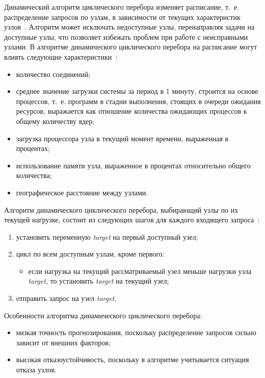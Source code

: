 Динамический алгоритм циклического перебора изменяет расписание, т.~е. распределение запросов по узлам, в зависимости от текущих характеристик узлов~\cite{drr}.
Алгоритм может исключать недоступные узлы, перенаправляя задачи на доступные узлы, что позволяет избежать проблем при работе с неисправными узлами. 
В алгоритме динамического циклического перебора на расписание могут влиять следующие характеристики~\cite{dll_warsh, com_analysis, part_algos}: 
\begin{itemize}
	\item количество соединений;
	\item среднее значение загрузки системы за период в 1 минуту, строится на основе процессов, т.~е. программ в стадии выполнения, стоящих в очереди ожидания ресурсов, выражается как отношение количества ожидающих процессов к общему количеству ядер;
	\item загрузка процессора узла в текущий момент времени, выраженная в процентах;
	\item использование памяти узла, выраженное в процентах относительно общего количества;
	\item географическое расстояние между узлами.
\end{itemize}
Алгоритм динамического циклического перебора, выбирающий узлы по их текущей нагрузке, состоит из следующих шагов для каждого входящего запроса~\cite{com_analysis}:
\begin{enumerate}
	\item установить переменную \textit{target} на первый доступный узел;
	\item цикл по всем доступным узлам, кроме первого:
	 \begin{itemize}
	 	\item если нагрузка на текущий рассматриваемый узел меньше нагрузки узла \textit{target}, то установить \textit{target} на текущий узел;
	 \end{itemize}
	\item отправить запрос на узел \textit{target}.
\end{enumerate}

Особенности алгоритма динамического циклического перебора:
\begin{itemize}
	\item низкая точность прогнозирования, поскольку распределение запросов сильно зависит от внешних факторов;
	\item высокая отказоустойчивость, поскольку в алгоритме учитывается ситуация отказа узлов.
\end{itemize}


